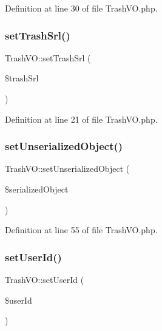 Definition at line 30 of file Trash\+V\+O.\+php.

\mbox{\label{classTrashVO_a2f8108d81c6db69b8c954b028bcef8dc}} 
\subsubsection{\texorpdfstring{set\+Trash\+Srl()}{setTrashSrl()}}
{\footnotesize\ttfamily Trash\+V\+O\+::set\+Trash\+Srl (\begin{DoxyParamCaption}\item[{}]{\$trash\+Srl }\end{DoxyParamCaption})}



Definition at line 21 of file Trash\+V\+O.\+php.

\mbox{\label{classTrashVO_affa3c85e2c01ad0e687afd9cdae171c0}} 
\subsubsection{\texorpdfstring{set\+Unserialized\+Object()}{setUnserializedObject()}}
{\footnotesize\ttfamily Trash\+V\+O\+::set\+Unserialized\+Object (\begin{DoxyParamCaption}\item[{}]{\$serialized\+Object }\end{DoxyParamCaption})}



Definition at line 55 of file Trash\+V\+O.\+php.

\mbox{\label{classTrashVO_a170dc90ea1fec615ccc7aef649f89390}} 
\subsubsection{\texorpdfstring{set\+User\+Id()}{setUserId()}}
{\footnotesize\ttfamily Trash\+V\+O\+::set\+User\+Id (\begin{DoxyParamCaption}\item[{}]{\$user\+Id }\end{DoxyParamCaption})}



